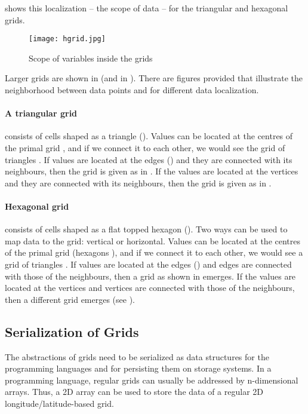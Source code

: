  shows this localization -- the scope of data -- for the triangular and hexagonal grids.

\begin{figure}[tb]
  \centering
  \texttt{[image: hgrid.jpg]}
  \caption{Scope of variables inside the grids}
  \label{fig:grid}
\end{figure}

Larger grids are shown in  (and in ).
There are figures provided that illustrate the neighborhood between data points and for different data localization.

\paragraph{A triangular grid} consists of cells shaped as a triangle ().
Values can be located at the centres of the primal grid , and if we connect it to each other, we would see the grid of triangles .
If values are located at the edges () and they are connected with its neighbours, then the grid is given as in .
If the values are located at the vertices and they are connected with its neighbours, then the grid is given as in .

\paragraph{Hexagonal grid} consists of cells shaped as a flat topped hexagon ().
Two ways can be used to map data to the grid: vertical or horizontal.
Values can be located at the centres of the primal grid (hexagons ), and if we connect it to each other, we would see a grid of triangles .
If values are located at the edges () and edges are connected with those of the neighbours, then a grid as shown in  emerges.
If the values are located at the vertices and vertices are connected with those of the neighbours, then a different grid emerges (see ).


\subsection{Serialization of Grids}
The abstractions of grids need to be serialized as data structures for the programming languages and for persisting them on storage systems.
In a programming language, regular grids can usually be addressed by n-dimensional arrays.
Thus, a 2D array can be used to store the data of a regular 2D longitude/latitude-based grid.

